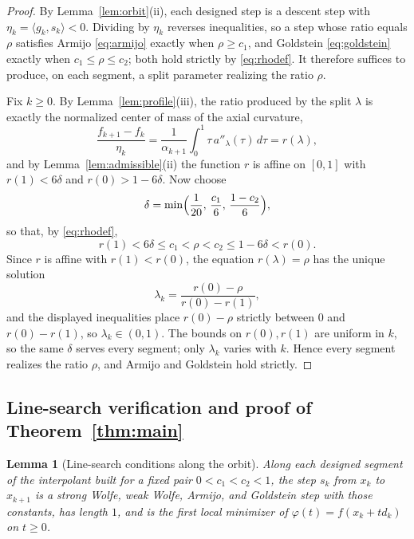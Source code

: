 \documentclass[11pt]{article}
\newtheorem{lemma}[theorem]{Lemma}
\newcommand{\ip}[2]{\langle #1,#2\rangle}
\begin{document}
\begin{proof}
By Lemma~\ref{lem:orbit}(ii), each designed step is a descent step with $\eta_k = \ip{g_k}{s_k} < 0$.
Dividing by $\eta_k$ reverses inequalities, so a step whose ratio equals $\rho$ satisfies Armijo \eqref{eq:armijo} exactly when $\rho \ge c_1$, and Goldstein \eqref{eq:goldstein} exactly when $c_1 \le \rho \le c_2$; both hold strictly by \eqref{eq:rhodef}.
It therefore suffices to produce, on each segment, a split parameter realizing the ratio $\rho$.

Fix $k\ge0$. By Lemma~\ref{lem:profile}(iii), the ratio produced by the split $\lambda$ is exactly the normalized center of mass of the axial curvature,
\begin{equation}
\label{eq:armijoratio}
\frac{f_{k+1}-f_k}{\eta_k} = \frac1{\alpha_{k+1}}\int_0^1\tau\,a''_\lambda(\tau)\,d\tau = r(\lambda),
\end{equation}
and by Lemma~\ref{lem:admissible}(ii) the function $r$ is affine on $[0,1]$ with $r(1)<6\delta$ and $r(0)>1-6\delta$. Now choose
\begin{equation}
\label{eq:delta-armijo}
\delta = \min\Bigl(\frac1{20},\,\frac{c_1}6,\,\frac{1-c_2}6\Bigr),
\end{equation}
so that, by \eqref{eq:rhodef},
\[
r(1) < 6\delta \le c_1 < \rho < c_2 \le 1 - 6\delta < r(0).
\]
Since $r$ is affine with $r(1)<r(0)$, the equation $r(\lambda)=\rho$ has the unique solution
\begin{equation}
\label{eq:lambdachoice}
\lambda_k = \frac{r(0)-\rho}{r(0)-r(1)},
\end{equation}
and the displayed inequalities place $r(0)-\rho$ strictly between $0$ and $r(0)-r(1)$, so $\lambda_k\in(0,1)$.
The bounds on $r(0),r(1)$ are uniform in $k$, so the same $\delta$ serves every segment; only $\lambda_k$ varies with $k$.
Hence every segment realizes the ratio $\rho$, and Armijo and Goldstein hold strictly.
\end{proof}

\subsection{Line-search verification and proof of Theorem~\ref{thm:main}}
\label{sec:proof}

\begin{lemma}[Line-search conditions along the orbit]
\label{lem:steps}
Along each designed segment of the interpolant built for a fixed pair
$0<c_1<c_2<1$, the step $s_k$ from $x_k$ to $x_{k+1}$ is a
strong Wolfe, weak Wolfe, Armijo, and Goldstein step with those
constants, has length $1$, and is the
first local minimizer of $\varphi(t)=f(x_k+td_k)$ on $t\ge0$.
\end{lemma}
\end{document}
